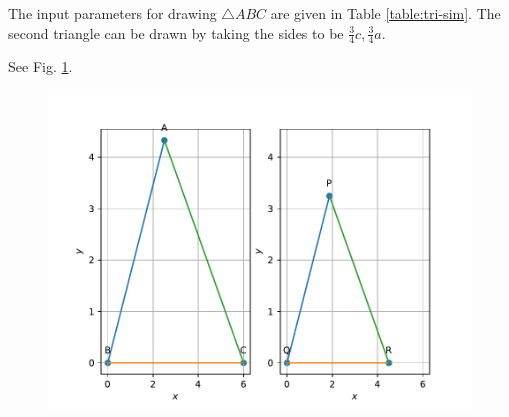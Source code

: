 \documentclass[journal,12pt,twocolumn]{IEEEtran}
\renewcommand\thesection{\arabic{section}}
\begin{document}
\begin{enumerate}[label=\thesection.\arabic*.,ref=\thesection.\theenumi]
	    \solution The input parameters for drawing $\triangle ABC$ are given in Table 
\eqref{table:tri-sim}.  The second triangle can be drawn by taking the sides to be $\frac{3}{4}c, \frac{3}{4}a$.
\begin{table}[ht!]
	
\caption{}
\label{table:tri-sim}	
\end{table}
    See Fig. 
	  \ref{fig:matrix-10-12.pdf}.
  \begin{figure}
	  \centering 
	  \includegraphics[width=\columnwidth]{figs/matrix-10-12.pdf}
	  \caption{}
	  \label{fig:matrix-10-12.pdf}
	  \end{figure}
    

\end{enumerate}
\end{document}
